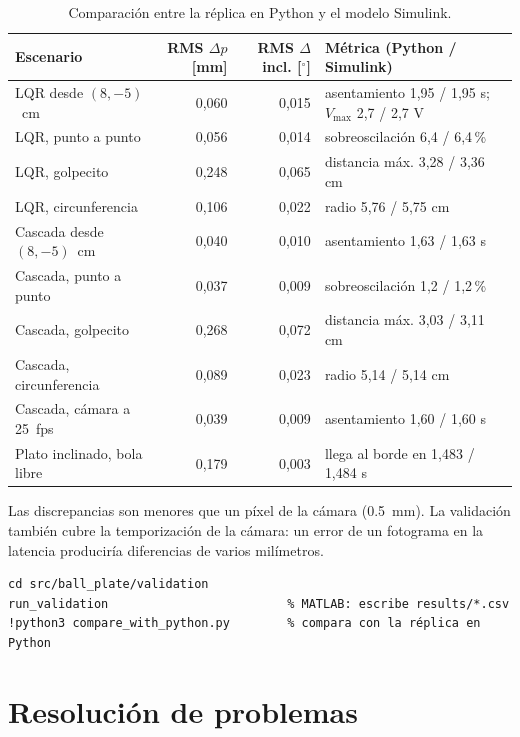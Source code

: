 \begin{table}[H]
\centering\small
\begin{tabularx}{\linewidth}{@{}lrrX@{}}
\toprule
Escenario & RMS $\Delta p$ [mm] & RMS $\Delta$incl. [$^\circ$] & Métrica (Python / Simulink)\\
\midrule
LQR desde $(8,-5)$~cm & 0,060 & 0,015 & asentamiento 1,95 / 1,95 s; $V_{\max}$ 2,7 / 2,7 V\\
LQR, punto a punto & 0,056 & 0,014 & sobreoscilación 6,4 / 6,4\,\%\\
LQR, golpecito & 0,248 & 0,065 & distancia máx. 3,28 / 3,36 cm\\
LQR, circunferencia & 0,106 & 0,022 & radio 5,76 / 5,75 cm\\
Cascada desde $(8,-5)$~cm & 0,040 & 0,010 & asentamiento 1,63 / 1,63 s\\
Cascada, punto a punto & 0,037 & 0,009 & sobreoscilación 1,2 / 1,2\,\%\\
Cascada, golpecito & 0,268 & 0,072 & distancia máx. 3,03 / 3,11 cm\\
Cascada, circunferencia & 0,089 & 0,023 & radio 5,14 / 5,14 cm\\
Cascada, cámara a \SI{25}{fps} & 0,039 & 0,009 & asentamiento 1,60 / 1,60 s\\
Plato inclinado, bola libre & 0,179 & 0,003 & llega al borde en 1,483 / 1,484 s\\
\bottomrule
\end{tabularx}
\caption{Comparación entre la réplica en Python y el modelo Simulink.}
\label{tab:validacion}
\end{table}

Las discrepancias son menores que un píxel de la cámara (\SI{0.5}{mm}). La validación también cubre la temporización de la cámara: un error de un fotograma en la latencia produciría diferencias de varios milímetros.

\begin{lstlisting}
cd src/ball_plate/validation
run_validation                         % MATLAB: escribe results/*.csv
!python3 compare_with_python.py        % compara con la réplica en Python
\end{lstlisting}

\chapter{Resolución de problemas}


